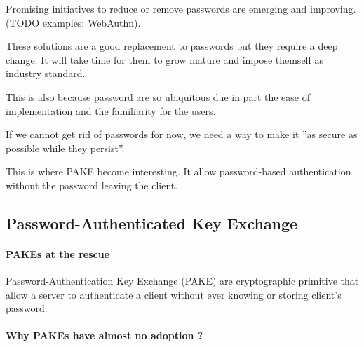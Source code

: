 \documentclass[../report.tex]{subfiles}
\begin{document}
Promising initiatives to reduce or remove passwords are emerging and improving. (TODO examples: WebAuthn).

These solutions are a good replacement to passwords but they require a deep change. It will take time for them to grow mature and impose themself as industry standard.

This is also because password are so ubiquitous due in part the ease of implementation and the familiarity for the users.

If we cannot get rid of passwords for now, we need a way to make it ''as secure as possible while they persist''.



This is where PAKE become interesting. It allow password-based authentication without the password leaving the client.




\subsection{Password-Authenticated Key Exchange}
\paragraph{PAKEs at the rescue}

Password-Authentication Key Exchange (PAKE) are cryptographic primitive that allow a server to authenticate a client without ever knowing or storing client's password.






\paragraph{Why PAKEs have almost no adoption ?}
\end{document}
